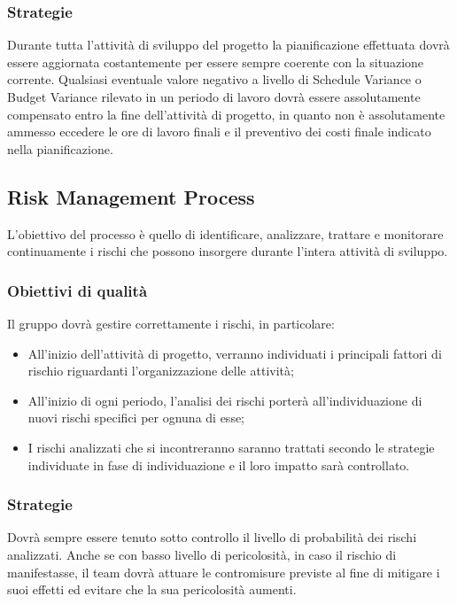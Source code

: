 \documentclass[../PianoDiQualifica.tex]{subfiles}
\begin{document}
			\subsubsection{Strategie}
			Durante tutta l'attività di sviluppo del progetto la pianificazione effettuata dovrà essere aggiornata costantemente per essere sempre coerente con la situazione corrente. Qualsiasi eventuale valore negativo a livello di Schedule Variance o Budget Variance rilevato in un periodo di lavoro dovrà essere assolutamente compensato entro la fine dell'attività di progetto, in quanto non è assolutamente ammesso eccedere le ore di lavoro finali e il preventivo dei costi finale indicato nella pianificazione.
						
		\subsection{Risk Management Process}
		L'obiettivo del processo è quello di identificare, analizzare, trattare e monitorare continuamente i rischi che possono insorgere durante l'intera attività di  sviluppo.
		
			\subsubsection{Obiettivi di qualità}
			Il gruppo dovrà gestire correttamente i rischi, in particolare:
			\begin{itemize}
				\item All'inizio dell'attività di progetto, verranno individuati i principali fattori di rischio riguardanti l'organizzazione delle attività;
				\item All'inizio di ogni periodo, l'analisi dei rischi porterà all'individuazione di nuovi rischi specifici per ognuna di esse;
				\item I rischi analizzati che si incontreranno saranno trattati secondo le strategie individuate in fase di individuazione e il loro impatto sarà controllato.
			\end{itemize}
			
			\subsubsection{Strategie}
			Dovrà sempre essere tenuto sotto controllo il livello di probabilità dei rischi analizzati. Anche se con basso livello di pericolosità, in caso il rischio di manifestasse, il team dovrà attuare le contromisure previste al fine di mitigare i suoi effetti ed evitare che la sua pericolosità aumenti.
			
\end{document}
